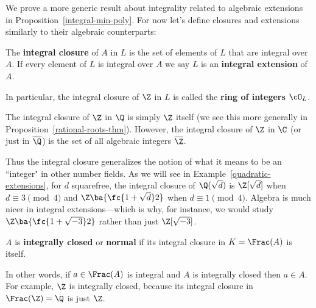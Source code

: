 \noindent We prove a more generic result about integrality related to algebraic extensions in Proposition~\ref{integral-min-poly}. For now let's define closures and extensions similarly to their algebraic counterparts:

\begin{df}
The \textbf{integral closure} of $A$ in $L$ is the set of elements of $L$ that are integral over $A$. If every element of $L$ is integral over $A$ we say $L$ is an \textbf{integral extension} of $A$.
\end{df}

\begin{df}
In particular, the integral closure of $\Z$ in $L$ is called the \textbf{ring of integers} $\cO_L$.
\end{df}

\begin{ex}
The integral closure of $\Z$ in $\Q$ is simply $\Z$ itself (we see this more generally in Proposition~\ref{rational-roots-thm}). However, the integral closure of $\Z$ in $\C$ (or just in $\overline\Q$) is the set of all algebraic integers $\overline\Z$.
\end{ex}

\noindent Thus the integral closure generalizes the notion of what it means to be an ``integer" in other number fields.
As we will see in Example~\ref{quadratic-extensions}, for $d$ squarefree, the integral closure of $\Q(\sqrt{d})$ is $\Z[\sqrt{d}]$ when $d\equiv 3\pmod 4$ and $\Z\ba{\fc{1+\sqrt{d}}2}$ when $d\equiv 1\pmod 4$.
Algebra is much nicer in integral extensions---which is why, for instance, we would study $\Z\ba{\fc{1+\sqrt{-3}}2}$ rather than just $\Z[\sqrt{-3}]$.

\begin{df}
$A$ is \textbf{integrally closed} or \textbf{normal} if its integral closure in $K=\Frac(A)$ is itself.
\end{df}

\begin{ex}
In other words, if $a \in \Frac(A)$ is integral and $A$ is integrally closed then $a \in A$. For example, $\Z$ is integrally closed, because its integral closure in $\Frac(\Z) = \Q$ is just $\Z$.
\end{ex}

